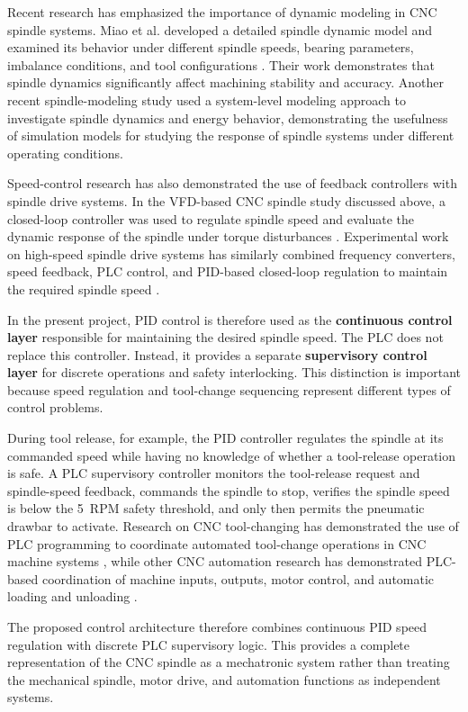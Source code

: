 \documentclass[12pt,a4paper]{report}
\begin{document}
	Recent research has emphasized the importance of dynamic modeling in CNC spindle systems. Miao et al. developed a detailed spindle dynamic model and examined its behavior under different spindle speeds, bearing parameters, imbalance conditions, and tool configurations \cite{ref11}. Their work demonstrates that spindle dynamics significantly affect machining stability and accuracy. Another recent spindle-modeling study used a system-level modeling approach to investigate spindle dynamics and energy behavior, demonstrating the usefulness of simulation models for studying the response of spindle systems under different operating conditions.
	
	Speed-control research has also demonstrated the use of feedback controllers with spindle drive systems. In the VFD-based CNC spindle study discussed above, a closed-loop controller was used to regulate spindle speed and evaluate the dynamic response of the spindle under torque disturbances \cite{ref13}. Experimental work on high-speed spindle drive systems has similarly combined frequency converters, speed feedback, PLC control, and PID-based closed-loop regulation to maintain the required spindle speed \cite{ref17}.
	
	In the present project, PID control is therefore used as the \textbf{continuous control layer} responsible for maintaining the desired spindle speed. The PLC does not replace this controller. Instead, it provides a separate \textbf{supervisory control layer} for discrete operations and safety interlocking. This distinction is important because speed regulation and tool-change sequencing represent different types of control problems.
	
	During tool release, for example, the PID controller regulates the spindle at its commanded speed while having no knowledge of whether a tool-release operation is safe. A PLC supervisory controller monitors the tool-release request and spindle-speed feedback, commands the spindle to stop, verifies the spindle speed is below the 5~RPM safety threshold, and only then permits the pneumatic drawbar to activate. Research on CNC tool-changing has demonstrated the use of PLC programming to coordinate automated tool-change operations in CNC machine systems \cite{ref14}, while other CNC automation research has demonstrated PLC-based coordination of machine inputs, outputs, motor control, and automatic loading and unloading \cite{ref15}.
	
	The proposed control architecture therefore combines continuous PID speed regulation with discrete PLC supervisory logic. This provides a complete representation of the CNC spindle as a mechatronic system rather than treating the mechanical spindle, motor drive, and automation functions as independent systems.
	
\end{document}
